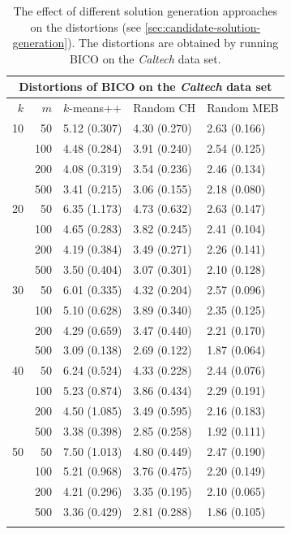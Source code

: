 \begin{longtable}{rrlll}
\multicolumn{5}{c}{\textbf{Distortions of BICO on the \textit{Caltech} data set}} \\
\toprule
 $k$ &   $m$ &    $k$-means++ &    Random CH &   Random MEB \\
\midrule
10  &  50 & 5.12 (0.307) & 4.30 (0.270) & 2.63 (0.166) \\
    & 100 & 4.48 (0.284) & 3.91 (0.240) & 2.54 (0.125) \\
    & 200 & 4.08 (0.319) & 3.54 (0.236) & 2.46 (0.134) \\
    & 500 & 3.41 (0.215) & 3.06 (0.155) & 2.18 (0.080) \\
\midrule
20  &  50 & 6.35 (1.173) & 4.73 (0.632) & 2.63 (0.147) \\
    & 100 & 4.65 (0.283) & 3.82 (0.245) & 2.41 (0.104) \\
    & 200 & 4.19 (0.384) & 3.49 (0.271) & 2.26 (0.141) \\
    & 500 & 3.50 (0.404) & 3.07 (0.301) & 2.10 (0.128) \\
\midrule
30  &  50 & 6.01 (0.335) & 4.32 (0.204) & 2.57 (0.096) \\
    & 100 & 5.10 (0.628) & 3.89 (0.340) & 2.35 (0.125) \\
    & 200 & 4.29 (0.659) & 3.47 (0.440) & 2.21 (0.170) \\
    & 500 & 3.09 (0.138) & 2.69 (0.122) & 1.87 (0.064) \\
\midrule
40  &  50 & 6.24 (0.524) & 4.33 (0.228) & 2.44 (0.076) \\
    & 100 & 5.23 (0.874) & 3.86 (0.434) & 2.29 (0.191) \\
    & 200 & 4.50 (1.085) & 3.49 (0.595) & 2.16 (0.183) \\
    & 500 & 3.38 (0.398) & 2.85 (0.258) & 1.92 (0.111) \\
\midrule
50  &  50 & 7.50 (1.013) & 4.80 (0.449) & 2.47 (0.190) \\
    & 100 & 5.21 (0.968) & 3.76 (0.475) & 2.20 (0.149) \\
    & 200 & 4.21 (0.296) & 3.35 (0.195) & 2.10 (0.065) \\
    & 500 & 3.36 (0.429) & 2.81 (0.288) & 1.86 (0.105) \\
\bottomrule
\caption{The effect of different solution generation approaches on the distortions (see \cref{sec:candidate-solution-generation}).
The distortions are obtained by running BICO on the \textit{Caltech} data set.
}
\label{tab:comparison-solution-generation-caltech-bico}
\end{longtable}

























